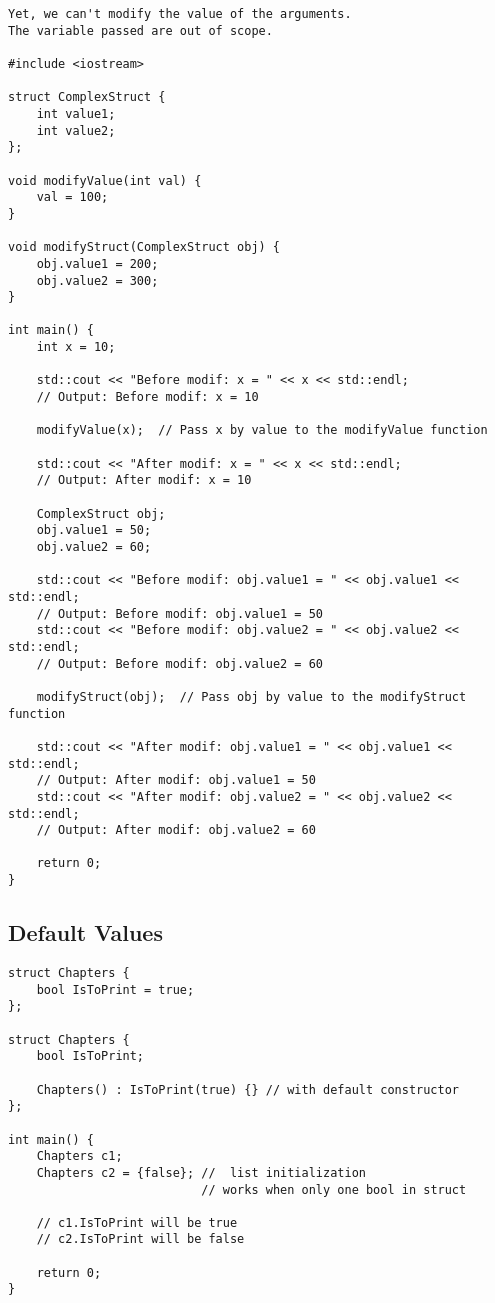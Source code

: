 \documentclass[openany]{report}
\begin{document}
\begin{verbatim}
Yet, we can't modify the value of the arguments.
The variable passed are out of scope.

#include <iostream>

struct ComplexStruct {
    int value1;
    int value2;
};

void modifyValue(int val) {
    val = 100;
}

void modifyStruct(ComplexStruct obj) {
    obj.value1 = 200;
    obj.value2 = 300;
}

int main() {
    int x = 10;

    std::cout << "Before modif: x = " << x << std::endl;  
    // Output: Before modif: x = 10

    modifyValue(x);  // Pass x by value to the modifyValue function

    std::cout << "After modif: x = " << x << std::endl;   
    // Output: After modif: x = 10

    ComplexStruct obj;
    obj.value1 = 50;
    obj.value2 = 60;

    std::cout << "Before modif: obj.value1 = " << obj.value1 << std::endl;  
    // Output: Before modif: obj.value1 = 50
    std::cout << "Before modif: obj.value2 = " << obj.value2 << std::endl;  
    // Output: Before modif: obj.value2 = 60

    modifyStruct(obj);  // Pass obj by value to the modifyStruct function

    std::cout << "After modif: obj.value1 = " << obj.value1 << std::endl;   
    // Output: After modif: obj.value1 = 50
    std::cout << "After modif: obj.value2 = " << obj.value2 << std::endl;   
    // Output: After modif: obj.value2 = 60

    return 0;
}

\end{verbatim}

\subsection{Default Values}

\begin{verbatim}
struct Chapters {
    bool IsToPrint = true;
};

struct Chapters {
    bool IsToPrint;

    Chapters() : IsToPrint(true) {} // with default constructor
};

int main() {
    Chapters c1;
    Chapters c2 = {false}; //  list initialization
                           // works when only one bool in struct

    // c1.IsToPrint will be true
    // c2.IsToPrint will be false

    return 0;
}
\end{verbatim}
\end{document}
